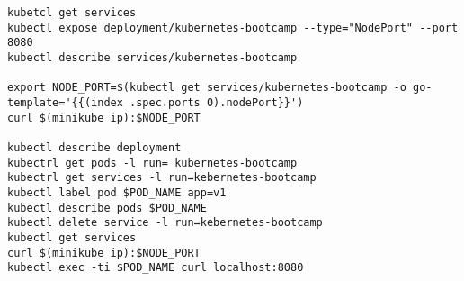 \begin{lstlisting}[caption={Bash Script for kubernates}]
kubetcl get services
kubectl expose deployment/kubernetes-bootcamp --type="NodePort" --port 8080
kubectl describe services/kubernetes-bootcamp

export NODE_PORT=$(kubectl get services/kubernetes-bootcamp -o go-template='{{(index .spec.ports 0).nodePort}}')
curl $(minikube ip):$NODE_PORT

kubectl describe deployment
kubectrl get pods -l run= kubernetes-bootcamp 
kubectrl get services -l run=kebernetes-bootcamp
kubectl label pod $POD_NAME app=v1
kubectl describe pods $POD_NAME
kubectl delete service -l run=kebernetes-bootcamp
kubectl get services 
curl $(minikube ip):$NODE_PORT 
kubectl exec -ti $POD_NAME curl localhost:8080
\end{lstlisting}